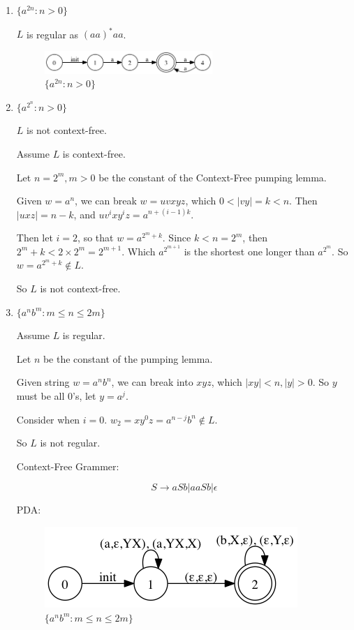 \documentclass[paper=a4, fontsize=11pt]{scrartcl} %
\begin{document}
\begin{enumerate}
\item
  \begin{fancyquotes}
    $\{a^{2n} : n>0\}$
  \end{fancyquotes}


  $L$ is regular as $(aa)^*aa$.

  \begin{figure}[hp]
    \centering
    \includegraphics[width=0.6\textwidth]{6-1.gv.png}
    \caption{$\{a^{2n} : n>0\}$}
  \end{figure}

\item
  \begin{fancyquotes}
    $\{a^{2^n} : n>0\}$
  \end{fancyquotes}


  $L$ is not context-free.

  Assume $L$ is context-free.

  Let $n = 2^m, m>0$ be the constant of the Context-Free pumping
  lemma.

  Given $w = a^{n}$, we can break $w = uvxyz$,
  which $0<|vy|=k<n$. Then $|uxz| = n-k$, and $uv^{i}xy^{i}z =
  a^{n+(i-1)k}$.

  Then let $i=2$, so that $w=a^{2^{m}+k}$.
  Since $k<n=2^{m}$, then $2^{m}+k<2\times 2^{m}=2^{m+1}$.
  Which $a^{2^{m+1}}$ is the shortest one longer than $a^{2^m}$.
  So $w = a^{2^{m}+k}\not\in L$.

  So $L$ is not context-free.

\item
  \begin{fancyquotes}
    $\{a^{n}b^{m} : m\leq n\leq 2m \}$
  \end{fancyquotes}

  Assume $L$ is regular.

  Let $n$ be the constant of the pumping lemma.

  Given string $w = a^{n}b^{n}$, we can break into $xyz$, which
  $|xy|<n, |y|>0$. So $y$ must be all $0$'s, let $y = a^{j}$.

  Consider when $i=0$. $w_2 = xy^{0}z = a^{n-j}b^{n}\not\in L$.

  So $L$ is not regular.

  Context-Free Grammer:

  \[
  S \rightarrow aSb | aaSb | \epsilon
  \]

  PDA:
  \begin{figure}[hp]
    \centering
    \includegraphics[scale=0.7]{6-1.gv.2.png}
    \caption{$\{a^{n}b^{m} : m\leq n\leq 2m \}$}
  \end{figure}

\end{enumerate}

\pagebreak
\end{document}
